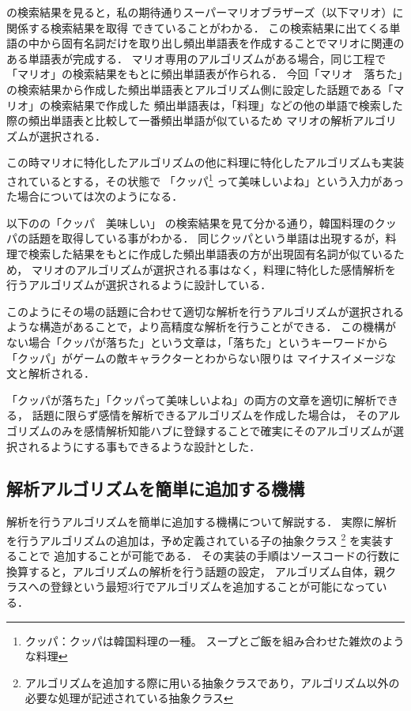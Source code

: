 の検索結果を見ると，私の期待通りスーパーマリオブラザーズ（以下マリオ）に関係する検索結果を取得
できていることがわかる．
この検索結果に出てくる単語の中から固有名詞だけを取り出し頻出単語表を作成することでマリオに関連のある単語表が完成する．
マリオ専用のアルゴリズムがある場合，同じ工程で「マリオ」の検索結果をもとに頻出単語表が作られる．
今回「マリオ　落ちた」の検索結果から作成した頻出単語表とアルゴリズム側に設定した話題である「マリオ」の検索結果で作成した
頻出単語表は，「料理」などの他の単語で検索した際の頻出単語表と比較して一番頻出単語が似ているため
マリオの解析アルゴリズムが選択される．

この時マリオに特化したアルゴリズムの他に料理に特化したアルゴリズムも実装されているとする，その状態で
「クッパ\footnote{クッパ：クッパは韓国料理の一種。 スープとご飯を組み合わせた雑炊のような料理}
って美味しいよね」という入力があった場合については次のようになる．

以下のの「クッパ　美味しい」
の検索結果を見て分かる通り，韓国料理のクッパの話題を取得している事がわかる．
同じクッパという単語は出現するが，料理で検索した結果をもとに作成した頻出単語表の方が出現固有名詞が似ているため，
マリオのアルゴリズムが選択される事はなく，料理に特化した感情解析を行うアルゴリズムが選択されるように設計している．


このようにその場の話題に合わせて適切な解析を行うアルゴリズムが選択されるような構造があることで，より高精度な解析を行うことができる．
この機構がない場合「クッパが落ちた」という文章は，「落ちた」というキーワードから「クッパ」がゲームの敵キャラクターとわからない限りは
マイナスイメージな文と解析される．

「クッパが落ちた」「クッパって美味しいよね」の両方の文章を適切に解析できる，
話題に限らず感情を解析できるアルゴリズムを作成した場合は，
そのアルゴリズムのみを感情解析知能ハブに登録することで確実にそのアルゴリズムが選択されるようにする事もできるような設計とした．

\subsection{解析アルゴリズムを簡単に追加する機構}
解析を行うアルゴリズムを簡単に追加する機構について解説する．
実際に解析を行うアルゴリズムの追加は，予め定義されている子の抽象クラス
\footnote{アルゴリズムを追加する際に用いる抽象クラスであり，アルゴリズム以外の必要な処理が記述されている抽象クラス}
を実装することで
追加することが可能である．
その実装の手順はソースコードの行数に換算すると，アルゴリズムの解析を行う話題の設定，
アルゴリズム自体，親クラスへの登録という最短3行でアルゴリズムを追加することが可能になっている．

